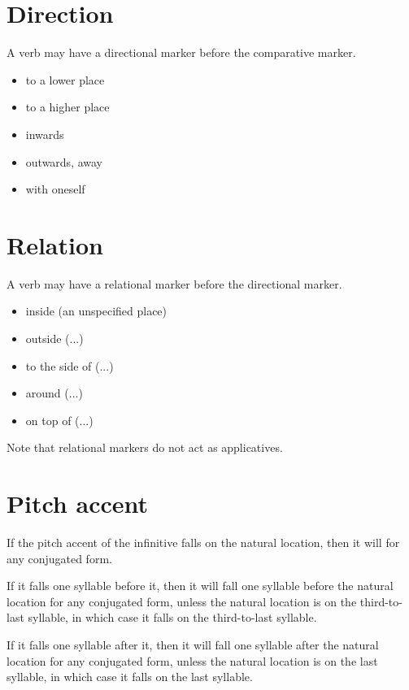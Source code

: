 \documentclass{book}
\begin{document}
\section{Direction}

A verb may have a directional marker before the comparative marker.

\begin{itemize}
    \item {} to a lower place
    \item {} to a higher place
    \item {} inwards
    \item {} outwards, away
    \item {} with oneself
\end{itemize}

\section{Relation}

A verb may have a relational marker before the directional marker.

\begin{itemize}
    \item {} inside (an unspecified place)
    \item {} outside (...)
    \item {} to the side of (...)
    \item {} around (...)
    \item {} on top of (...)
\end{itemize}

Note that relational markers do not act as applicatives.

\section{Pitch accent}

If the pitch accent of the infinitive falls on the natural location, then it will for any conjugated form.

If it falls one syllable before it, then it will fall one syllable before the natural location for any conjugated form, unless the natural location is on the third-to-last syllable, in which case it falls on the third-to-last syllable.

If it falls one syllable after it, then it will fall one syllable after the natural location for any conjugated form, unless the natural location is on the last syllable, in which case it falls on the last syllable.
\end{document}

